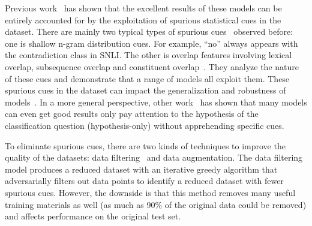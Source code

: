 Previous work~\cite{niven2019probing,mccoy2019right} has shown that the excellent results of these models 
can be entirely accounted for by the exploitation of spurious 
statistical cues in the dataset. 
There are mainly two typical types of spurious 
cues~\cite{naik2018stress,mccoy2019right,schuster2019towards,nie2019adversarial} observed before:
one is shallow n-gram distribution cues. For example, ``no'' always appears with the contradiction 
class in SNLI.
The other is overlap features involving lexical overlap, 
subsequence overlap and constituent overlap~\cite{mccoy2019right}.
They analyze the nature of these cues and 
demonstrate that a range of models all exploit them.
These spurious cues in the dataset can impact the generalization 
and robustness of models~\cite{bras2020adversarial}. 
In a more general perspective, other work~\cite{gururangan2018annotation,zellers2018swag} 
has shown that many models can even 
get good results only pay attention to the hypothesis of the classification question (hypothesis-only) 
without apprehending specific cues. 

To eliminate spurious cues, 
there are two kinds of techniques to improve the quality of the datasets: 
data filtering~\cite{bras2020adversarial} and data augmentation.  
The data filtering model 
produces a reduced dataset with
an iterative greedy algorithm that adversarially filters out data points to
identify a reduced dataset with fewer spurious cues. 
However, the downside is that this method removes many useful training materials as well
(as much as 90\% of the original data could be removed) and affects performance on the original test set.


